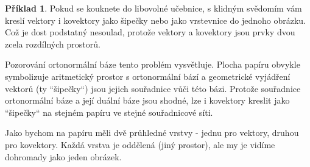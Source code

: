 \documentclass[a5paper,12pt]{amsbook}
\theoremstyle{definition}
\newtheorem{example}{Příklad}[chapter]
\begin{document}
\begin{example}
Pokud se kouknete do libovolné učebnice, s klidným svědomím vám kreslí vektory i kovektory
jako šipečky nebo jako vrstevnice do jednoho obrázku. Což je dost podstatný nesoulad,
protože vektory a kovektory jsou prvky dvou zcela rozdílných prostorů.

Pozorování ortonormální báze tento problém vysvětluje. Plocha papíru obvykle symbolizuje
aritmetický prostor s ortonormální bází a geometrické vyjádření vektorů (ty ``šipečky``)
jsou jejich souřadnice vůči této bázi. Protože souřadnice ortonormální báze a její duální
báze jsou shodné, lze i kovektory kreslit jako ``šipečky`` na stejném papíru ve stejné
souřadnicové síti.

Jako bychom na papíru měli dvě průhledné vrstvy - jednu pro vektory, druhou pro kovektory.
Každá vrstva je oddělená (jiný prostor), ale my je vidíme dohromady jako jeden obrázek.

\end{example}
\end{document}
